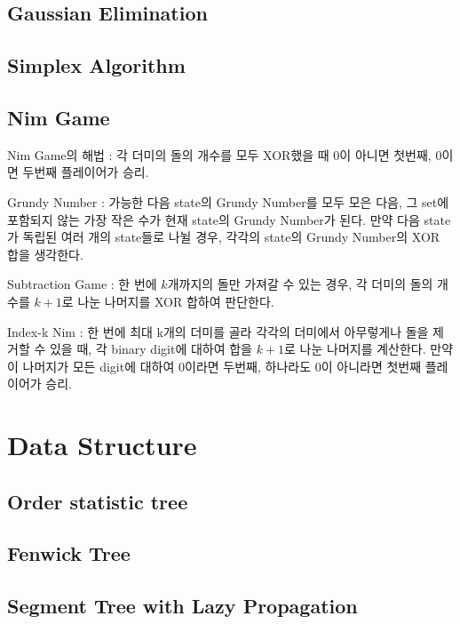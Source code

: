 \documentclass[10pt,landscape,a4paper,twocolumn]{article}
\begin{document}
\subsection{Gaussian Elimination}


\subsection{Simplex Algorithm}


\subsection{Nim Game}

Nim Game의 해법 : 각 더미의 돌의 개수를 모두 XOR했을 때 $0$이 아니면 첫번째, $0$이면 두번째 플레이어가 승리.

Grundy Number : 가능한 다음 state의 Grundy Number를 모두 모은 다음, 그 set에 포함되지 않는
가장 작은 수가 현재 state의 Grundy Number가 된다. 만약 다음 state가
독립된 여러 개의 state들로 나뉠 경우, 각각의 state의 Grundy Number의 XOR 합을 생각한다.

Subtraction Game : 한 번에 $k$개까지의 돌만 가져갈 수 있는 경우,
각 더미의 돌의 개수를 $k + 1$로 나눈 나머지를 XOR 합하여 판단한다.

Index-k Nim : 한 번에 최대 k개의 더미를 골라 각각의 더미에서 아무렇게나 돌을
제거할 수 있을 때, 각 binary digit에 대하여 합을 $k + 1$로 나눈 나머지를 계산한다.
만약 이 나머지가 모든 digit에 대하여 $0$이라면 두번째, 하나라도 $0$이 아니라면
첫번째 플레이어가 승리.


\section{Data Structure}

\subsection{Order statistic tree}


\subsection{Fenwick Tree}


\subsection{Segment Tree with Lazy Propagation}

\end{document}
